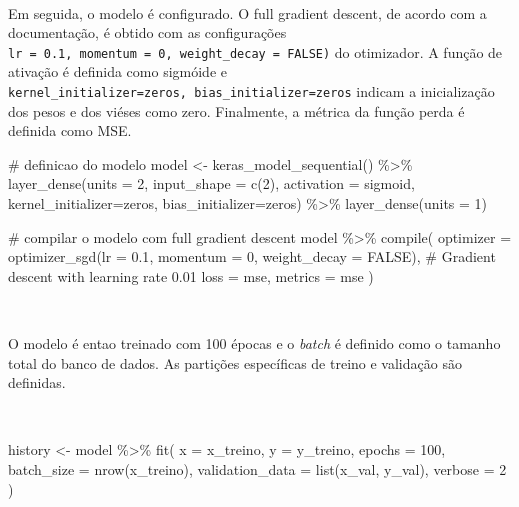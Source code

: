 \documentclass[
  a4paperpaper,
]{article}
\newenvironment{Shaded}{\begin{snugshade}}{\end{snugshade}}
\newcommand{\AttributeTok}[1]{\textcolor[rgb]{0.40,0.45,0.13}{#1}}
\newcommand{\CommentTok}[1]{\textcolor[rgb]{0.37,0.37,0.37}{#1}}
\newcommand{\ConstantTok}[1]{\textcolor[rgb]{0.56,0.35,0.01}{#1}}
\newcommand{\DecValTok}[1]{\textcolor[rgb]{0.68,0.00,0.00}{#1}}
\newcommand{\FloatTok}[1]{\textcolor[rgb]{0.68,0.00,0.00}{#1}}
\newcommand{\FunctionTok}[1]{\textcolor[rgb]{0.28,0.35,0.67}{#1}}
\newcommand{\NormalTok}[1]{\textcolor[rgb]{0.00,0.23,0.31}{#1}}
\newcommand{\OtherTok}[1]{\textcolor[rgb]{0.00,0.23,0.31}{#1}}
\newcommand{\SpecialCharTok}[1]{\textcolor[rgb]{0.37,0.37,0.37}{#1}}
\newcommand{\StringTok}[1]{\textcolor[rgb]{0.13,0.47,0.30}{#1}}
\begin{document}
~

Em seguida, o modelo é configurado. O full gradient descent, de acordo
com a documentação, é obtido com as configurações
\texttt{lr\ =\ 0.1,\ momentum\ =\ 0,\ weight\_decay\ =\ FALSE)} do
otimizador. A função de ativação é definida como sigmóide e
\texttt{kernel\_initializer=\textquotesingle{}zeros\textquotesingle{},\ bias\_initializer=\textquotesingle{}zeros\textquotesingle{}}
indicam a inicialização dos pesos e dos viéses como zero. Finalmente, a
métrica da função perda é definida como MSE. ~

\begin{Shaded}
\begin{Highlighting}[]
\CommentTok{\# definicao do modelo}
\NormalTok{model }\OtherTok{\textless{}{-}} \FunctionTok{keras\_model\_sequential}\NormalTok{() }\SpecialCharTok{\%\textgreater{}\%}
  \FunctionTok{layer\_dense}\NormalTok{(}\AttributeTok{units =} \DecValTok{2}\NormalTok{, }\AttributeTok{input\_shape =} \FunctionTok{c}\NormalTok{(}\DecValTok{2}\NormalTok{), }\AttributeTok{activation =} \StringTok{\textquotesingle{}sigmoid\textquotesingle{}}\NormalTok{, }\AttributeTok{kernel\_initializer=}\StringTok{\textquotesingle{}zeros\textquotesingle{}}\NormalTok{, }\AttributeTok{bias\_initializer=}\StringTok{\textquotesingle{}zeros\textquotesingle{}}\NormalTok{) }\SpecialCharTok{\%\textgreater{}\%}
  \FunctionTok{layer\_dense}\NormalTok{(}\AttributeTok{units =} \DecValTok{1}\NormalTok{)}

\CommentTok{\# compilar o modelo com full gradient descent}
\NormalTok{model }\SpecialCharTok{\%\textgreater{}\%} \FunctionTok{compile}\NormalTok{(}
  \AttributeTok{optimizer =} \FunctionTok{optimizer\_sgd}\NormalTok{(}\AttributeTok{lr =} \FloatTok{0.1}\NormalTok{, }\AttributeTok{momentum =} \DecValTok{0}\NormalTok{, }\AttributeTok{weight\_decay =} \ConstantTok{FALSE}\NormalTok{),  }\CommentTok{\# Gradient descent with learning rate 0.01}
  \AttributeTok{loss =} \StringTok{\textquotesingle{}mse\textquotesingle{}}\NormalTok{,}
  \AttributeTok{metrics =} \StringTok{\textquotesingle{}mse\textquotesingle{}}
\NormalTok{)}
\end{Highlighting}
\end{Shaded}

~

O modelo é entao treinado com 100 épocas e o \emph{batch} é definido
como o tamanho total do banco de dados. As partições específicas de
treino e validação são definidas.

~

\begin{Shaded}
\begin{Highlighting}[]
\NormalTok{history }\OtherTok{\textless{}{-}}\NormalTok{ model }\SpecialCharTok{\%\textgreater{}\%} \FunctionTok{fit}\NormalTok{(}
  \AttributeTok{x =}\NormalTok{ x\_treino,}
  \AttributeTok{y =}\NormalTok{ y\_treino,}
  \AttributeTok{epochs =} \DecValTok{100}\NormalTok{,        }
  \AttributeTok{batch\_size =} \FunctionTok{nrow}\NormalTok{(x\_treino),  }
  \AttributeTok{validation\_data =} \FunctionTok{list}\NormalTok{(x\_val, y\_val), }
  \AttributeTok{verbose =} \DecValTok{2}
\NormalTok{)}
\end{Highlighting}
\end{Shaded}
\end{document}
